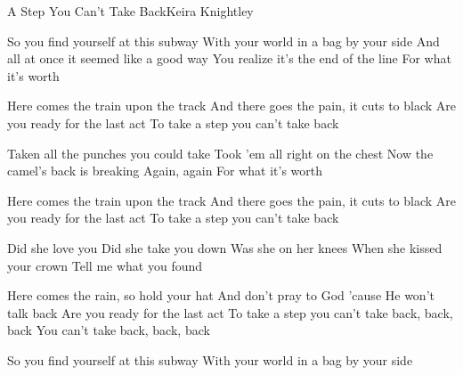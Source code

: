 \documentclass[a4paper,11pt,french]{article}
\begin{document}

\begin{Song}{A Step You Can't Take Back}{Keira Knightley}
\begin{multicols}{2}

\begin{Verse}
So you find yourself at this subway
With your world in a bag by your side
And all at once it seemed like a good way
You realize it's the end of the line
For what it's worth
\end{Verse}
\espaceInterStrophe

\begin{Chorus}
Here comes the train upon the track
And there goes the pain, it cuts to black
Are you ready for the last act
To take a step you can't take back
\end{Chorus}
\espaceInterStrophe

\begin{Verse}
Taken all the punches you could take
Took 'em all right on the chest
Now the camel's back is breaking
Again, again
For what it's worth
\end{Verse}
\espaceInterStrophe

\begin{Chorus}
Here comes the train upon the track
And there goes the pain, it cuts to black
Are you ready for the last act
To take a step you can't take back
\end{Chorus}
\vfill
\columnbreak

\begin{Bridge}
Did she love you
Did she take you down
Was she on her knees
When she kissed your crown
Tell me what you found
\end{Bridge}
\espaceInterStrophe

\begin{Chorus}
Here comes the rain, so hold your hat
And don't pray to God
'cause He won't talk back
Are you ready for the last act
To take a step you can't take back, back, back
You can't take back, back, back
\end{Chorus}
\espaceInterStrophe

\begin{Verse}
So you find yourself at this subway
With your world in a bag by your side
\end{Verse}

\end{multicols}

\vfill
{}


\end{Song}
\end{document}
